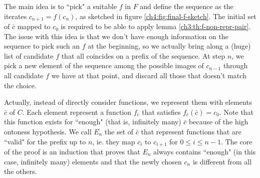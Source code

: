 The main idea is to ``pick" a suitable $f$ in $F$ and define the sequence as the iterates $c_{n+1} = f(c_n)$, as sketched in figure \ref{ch4:fig:final-f-sketch}. The initial set of $\bar{c}$ mapped to $c_0$ is required to be able to apply lemma \ref{ch3:th:f-non-repr-pair}.
The issue with this idea is that we don't have enough information on the sequence to pick such an $f$ at the beginning, so we actually bring along a (huge) list of candidate $f$ that all coincides on a prefix of the sequence. At step $n$, we pick a new element of the sequence among the possible images of $c_{n-1}$ through all candidate $f$ we have at that point, and discard all those that doesn't match the choice.

Actually, instead of directly consider functions, we represent them with elements $\bar{c}$ of $C$. Each element represent a function $f_{\bar{c}}$ that satisfies $f_{\bar{c}}(\bar{c}) = c_0$. Note that this function exists for ``enough" (that is, infinitely many) $\bar{c}$ because of the high ontoness hypothesis. We call $E_n$ the set of $\bar{c}$ that represent functions that are ``valid" for the prefix up to $n$, ie. they map $c_{i}$ to $c_{i+1}$ for $0 \le i \le n - 1$. The core of the proof is an induction that proves that $E_n$ always contains ``enough" (in this case, infinitely many) elements and that the newly chosen $c_n$ is different from all the others.

